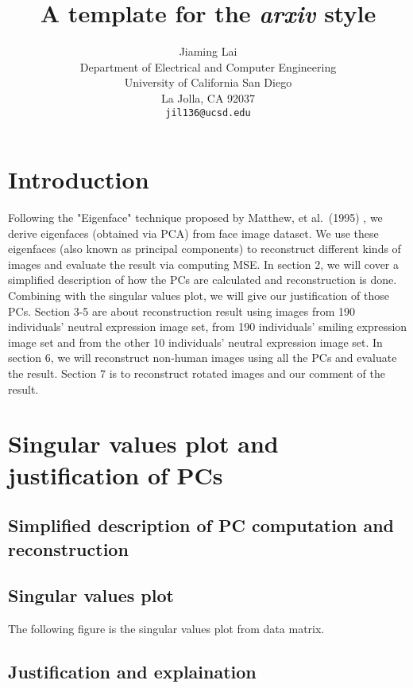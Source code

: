 \documentclass{article}
\title{A template for the \emph{arxiv} style}
\author{
  Jiaming Lai\\
  Department of Electrical and Computer Engineering\\
  University of California San Diego\\
  La Jolla, CA 92037 \\
  \texttt{jil136@ucsd.edu} \\
}
\begin{document}
\maketitle


\section{Introduction}
Following the "Eigenface" technique proposed by Matthew, et al.\ (1995)
\cite{eigenface1}\cite{eigenface2}, we derive eigenfaces (obtained via PCA) from face image
dataset. We use these eigenfaces (also known as principal components) to reconstruct different
kinds of images and evaluate the result via computing MSE. In section 2, we will cover a simplified
description of how the PCs are calculated and reconstruction is done. Combining with the singular 
values plot, we will give our justification of those PCs. Section 3-5 are about reconstruction result
using images from 190 individuals’ neutral expression image set, from 190 individuals’ smiling expression
image set and from the other 10 individuals’ neutral expression image set. In section 6, we will reconstruct
non-human images using all the PCs and evaluate the result. Section 7 is to reconstruct rotated images
and our comment of the result.

\section{Singular values plot and justification of PCs}
\subsection{Simplified description of PC computation and reconstruction}

\subsection{Singular values plot}
The following figure is the singular values plot from data matrix.

\subsection{Justification and explaination}
\end{document}
